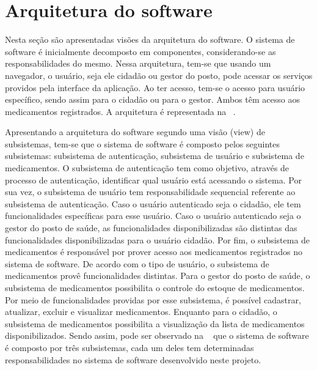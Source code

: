 \section{Arquitetura do software}
\label{sec:arquitetura}

Nesta seção são apresentadas visões da arquitetura do software. O sistema de software é inicialmente decomposto em componentes, considerando-se as responsabilidades do mesmo. Nessa arquitetura, tem-se que usando um navegador, o usuário, seja ele cidadão ou gestor do posto, pode acessar os serviços providos pela interface da aplicação. Ao ter acesso, tem-se o acesso para usuário específico, sendo assim para o cidadão ou para o gestor. Ambos têm acesso aos medicamentos registrados. A arquitetura é representada na  ~.

%

%

Apresentando a arquitetura do software segundo uma visão (view) de subsistemas, tem-se que o sistema de software é composto pelos seguintes subsistemas: subsistema de autenticação, subsistema de usuário e subsistema de medicamentos. O subsistema de autenticação tem como objetivo, através de processo de autenticação, identificar qual usuário está acessando o sistema. Por sua vez, o subsistema de usuário tem responsabilidade sequencial referente ao subsistema de autenticação. Caso o usuário autenticado seja o cidadão, ele tem funcionalidades específicas para esse usuário. Caso o usuário autenticado seja o gestor do posto de saúde, as funcionalidades disponibilizadas são distintas das funcionalidades disponibilizadas para o usuário cidadão. Por fim, o subsistema de medicamentos é responsável por prover acesso aos medicamentos registrados no sistema de software. De acordo com o tipo de usuário, o subsistema de medicamentos provê funcionalidades distintas. Para o gestor do posto de saúde, o subsistema de medicamentos possibilita o controle do estoque de medicamentos. Por meio de funcionalidades providas por esse subsistema, é possível cadastrar, atualizar, excluir e visualizar medicamentos. Enquanto para o cidadão, o subsistema de medicamentos possibilita a visualização da lista de medicamentos disponibilizados. Sendo assim, pode ser observado na ~ que o sistema de software é composto por três subsistemas, cada um deles tem determinadas responsabilidades no sistema de software desenvolvido neste projeto.

